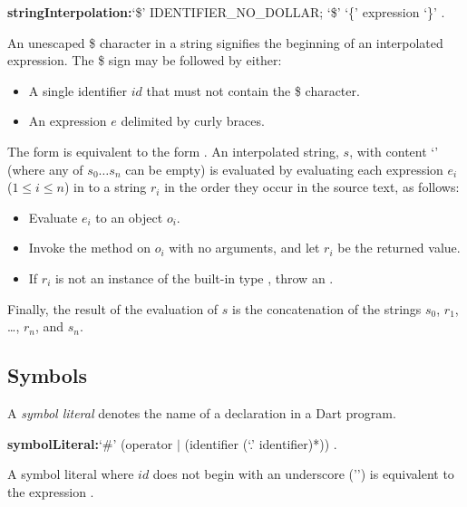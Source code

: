 \documentclass{article}
\begin{document}
\begin{grammar}
{\bf stringInterpolation:}`\$' IDENTIFIER\_NO\_DOLLAR;
  `\$' `\{' expression `\}'
  .
\end{grammar}


\LMHash{}
An unescaped \$ character in a string signifies the beginning of an interpolated expression.
The \$ sign may be followed by either:
\begin{itemize}
\item A single identifier $id$ that must not contain the \$ character.
\item An expression $e$ delimited by curly braces.
\end{itemize}

\LMHash{}
The form  is equivalent to the form .
An interpolated string, $s$, with content `' (where any of $s_0 \ldots{} s_n$ can be empty)
is evaluated by evaluating each expression $e_i$ ($1 \le i \le n$) in to a string $r_i$ in the order they occur in the source text, as follows:
\begin{itemize}
\item{} Evaluate $e_i$ to an object $o_i$.
\item{} Invoke the  method on $o_i$ with no arguments, and let
 $r_i$ be the returned value.
\item{} If $r_i$ is not an instance of the built-in type , throw an .
\end{itemize}
Finally, the result of the evaluation of $s$ is the concatenation of the strings $s_0$, $r_1$, \ldots{}, $r_n$, and $s_n$.


\subsection{Symbols}

\LMHash{}
A {\em symbol literal} denotes the name of a declaration in a Dart program.

\begin{grammar}
{\bf symbolLiteral:}`\#' (operator $|$ (identifier (`{\escapegrammar .}' identifier)*))
  .
\end{grammar}

\LMHash{}
A symbol literal  where $id$ does not begin with an underscore ('\code{\_}') is equivalent to the expression .
\end{document}
